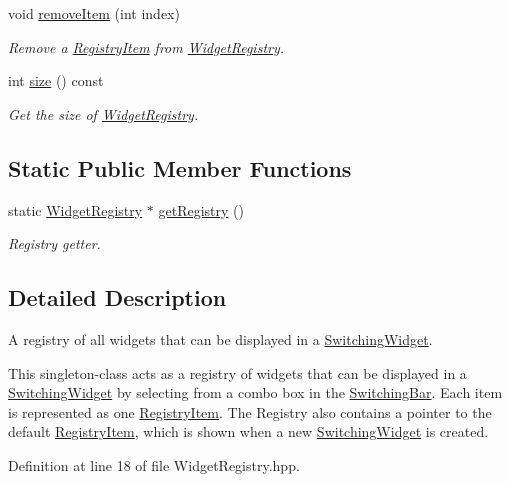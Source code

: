 \begin{DoxyCompactItemize}
void \hyperlink{class_widget_registry_a96abefe3fed38e9424609cc3cf2f8d7d}{remove\+Item} (int index)
\begin{DoxyCompactList}\small\item\em Remove a \hyperlink{class_registry_item}{Registry\+Item} from \hyperlink{class_widget_registry}{Widget\+Registry}. \end{DoxyCompactList}\item 
int \hyperlink{class_widget_registry_ac7439152ea46435f870466eeb0d619f5}{size} () const 
\begin{DoxyCompactList}\small\item\em Get the size of \hyperlink{class_widget_registry}{Widget\+Registry}. \end{DoxyCompactList}\end{DoxyCompactItemize}
\subsection*{Static Public Member Functions}
\begin{DoxyCompactItemize}
\item 
static \hyperlink{class_widget_registry}{Widget\+Registry} $\ast$ \hyperlink{class_widget_registry_ad0c8eaf65a4c00947866a56cc2c48eb2}{get\+Registry} ()
\begin{DoxyCompactList}\small\item\em Registry getter. \end{DoxyCompactList}\end{DoxyCompactItemize}


\subsection{Detailed Description}
A registry of all widgets that can be displayed in a \hyperlink{class_switching_widget}{Switching\+Widget}. 

This singleton-\/class acts as a registry of widgets that can be displayed in a \hyperlink{class_switching_widget}{Switching\+Widget} by selecting from a combo box in the \hyperlink{class_switching_bar}{Switching\+Bar}. Each item is represented as one \hyperlink{class_registry_item}{Registry\+Item}. The Registry also contains a pointer to the default \hyperlink{class_registry_item}{Registry\+Item}, which is shown when a new \hyperlink{class_switching_widget}{Switching\+Widget} is created. 

Definition at line 18 of file Widget\+Registry.\+hpp.



